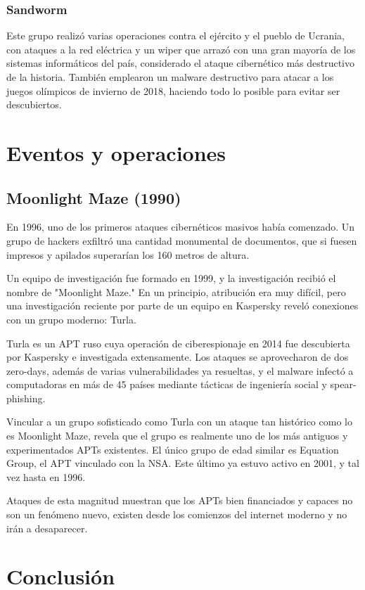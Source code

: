 \documentclass{article}
\begin{document}
\subsubsection{Sandworm}
Este grupo realizó varias operaciones contra el ejército y el pueblo de Ucrania, con ataques a la red eléctrica y un wiper que arrazó con una gran mayoría de los sistemas informáticos del país, considerado el ataque cibernético más destructivo de la historia. También emplearon un malware destructivo para atacar a los juegos olímpicos de invierno de 2018, haciendo todo lo posible para evitar ser descubiertos.


\section{Eventos y operaciones}

\subsection{Moonlight Maze (1990)}
En 1996, uno de los primeros ataques cibernéticos masivos había comenzado. Un grupo de hackers exfiltró una cantidad monumental de documentos, que si fuesen impresos y apilados superarían los 160 metros de altura.

Un equipo de investigación fue formado en 1999, y la investigación recibió el nombre de "Moonlight Maze." En un principio, atribución era muy difícil, pero una investigación reciente por parte de un equipo en Kaspersky reveló conexiones con un grupo moderno: Turla.

Turla es un APT ruso cuya operación de ciberespionaje en 2014 fue descubierta por Kaspersky e investigada extensamente. Los ataques se aprovecharon de dos zero-days, además de varias vulnerabilidades ya resueltas, y el malware infectó a computadoras en más de 45 países mediante tácticas de ingeniería social y spear-phishing.

Vincular a un grupo sofisticado como Turla con un ataque tan histórico como lo es Moonlight Maze, revela que el grupo es realmente uno de los más antiguos y experimentados APTs existentes. El único grupo de edad similar es Equation Group, el APT vinculado con la NSA. Este último ya estuvo activo en 2001, y tal vez hasta en 1996.

Ataques de esta magnitud muestran que los APTs bien financiados y capaces no son un fenómeno nuevo, existen desde los comienzos del internet moderno y no irán a desaparecer.

\section{Conclusión}

\newpage
\printbibliography
\end{document}
